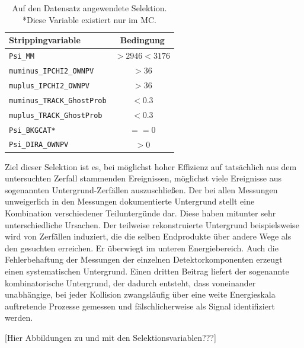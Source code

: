 \begin{table}[htb]
  \centering
  \caption{Auf den Datensatz angewendete Selektion. *Diese Variable existiert nur im MC.}
  \begin{tabular}{lc}
    \toprule
    Strippingvariable                 & Bedingung      \\
    \midrule
    \texttt{Psi\_MM}                  & $>\num{2946}<\num{3176}$  \\
    \texttt{muminus\_IPCHI2\_OWNPV}   & $>\num{36}$  \\
    \texttt{muplus\_IPCHI2\_OWNPV}    & $>\num{36}$  \\
    \texttt{muminus\_TRACK\_GhostProb}& $<\num{0.3}$ \\
    \texttt{muplus\_TRACK\_GhostProb} & $<\num{0.3}$ \\
    \texttt{Psi\_BKGCAT*}             & $==\num{0}$  \\
    \texttt{Psi\_DIRA\_OWNPV}         & $>\num{0}$  \\
    \bottomrule
  \end{tabular}
  \label{tab:strip}
\end{table}

Ziel dieser Selektion ist es, bei möglichst hoher Effizienz auf tatsächlich aus dem untersuchten Zerfall stammenden Ereignissen, möglichst viele Ereignisse aus sogenannten Untergrund-Zerfällen auszuschließen. Der bei allen Messungen unweigerlich in den Messungen dokumentierte Untergrund stellt eine Kombination verschiedener Teiluntergünde dar. Diese haben mitunter sehr unterschiedliche Ursachen. Der teilweise rekonstruierte Untergrund beispielsweise wird von Zerfällen induziert, die die selben Endprodukte über andere Wege als den gesuchten erreichen. Er überwiegt im unteren Energiebereich. Auch die Fehlerbehaftung der Messungen der einzelnen Detektorkomponenten erzeugt einen systematischen Untergrund. Einen dritten Beitrag liefert der sogenannte kombinatorische Untergrund, der dadurch entsteht, dass voneinander unabhängige, bei jeder Kollision zwangsläufig über eine weite Energieskala auftretende Prozesse gemessen und fälschlicherweise als Signal identifiziert werden.

[Hier Abbildungen zu und mit den Selektionsvariablen???]

